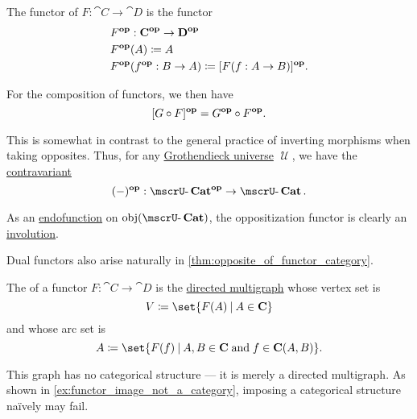 \begin{definition}\label{def:opposite_functor}
  The  functor of \( F: \cat{C} \to \cat{D} \) is the functor
  \begin{equation*}
    \begin{aligned}
      &F^\oppos: \cat{C}^\oppos \to \cat{D}^\oppos \\
      &F^\oppos(A) \coloneqq A \\
      &F^\oppos(f^\oppos: B \to A) \coloneqq [F(f: A \to B)]^\oppos.
    \end{aligned}
  \end{equation*}

  For the composition of functors, we then have
  \begin{equation}\label{eq:def:opposite_functor/composition}
    [G \bincirc F]^\oppos = G^\oppos \bincirc F^\oppos.
  \end{equation}

  This is somewhat in contrast to the general practice of inverting morphisms when taking opposites. Thus, for any \hyperref[def:grothendieck_universe]{Grothendieck universe} \( \mscrU \), we have the \hyperref[rem:contravariant_functor]{contravariant} 
  \begin{equation*}
    (\anon*)^\oppos: \ucat{Cat}^\oppos \to \ucat{Cat}.
  \end{equation*}

  As an \hyperref[def:function/endofunction]{endofunction} on \( \obj(\ucat{Cat}) \), the oppositization functor is clearly an \hyperref[def:morphism_invertibility/involution]{involution}.

  Dual functors also arise naturally in \cref{thm:opposite_of_functor_category}.
\end{definition}

\begin{definition}\label{def:functor_image}
  The  of a functor \( F: \cat{C} \to \cat{D} \) is the \hyperref[def:directed_multigraph]{directed multigraph} whose vertex set is
  \begin{equation*}
    V \coloneqq \set{ F(A) \given A \in \cat{C} }
  \end{equation*}
  and whose arc set is
  \begin{equation*}
    A \coloneqq \set{ F(f) \given A, B \in \cat{C} \T{and} f \in \cat{C}(A, B) }.
  \end{equation*}

  This graph has no categorical structure --- it is merely a directed multigraph. As shown in \cref{ex:functor_image_not_a_category}, imposing a categorical structure na\"ively may fail.
\end{definition}

